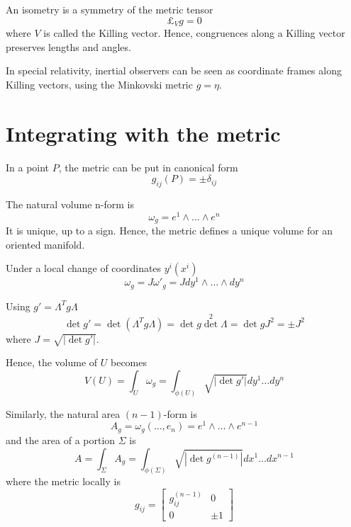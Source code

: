    An isometry is a symmetry of the metric tensor 
    \begin{equation*}
        \pounds_V g = 0
    \end{equation*}
    where $V$ is called the Killing vector. Hence, congruences along a Killing vector preserves lengths and angles.

    In special relativity, inertial observers can be seen as coordinate frames along Killing vectors, using the Minkovski metric $g = \eta$.

\section{Integrating with the metric}

    In a point $P$, the metric can be put in canonical form 
    \begin{equation*}
        g_{ij} (P) = \pm \delta_{ij}
    \end{equation*}

    The natural volume n-form is 
    \begin{equation*}
        \omega_g = e^1 \wedge \ldots \wedge e^n
    \end{equation*}
    It is unique, up to a sign. Hence, the metric defines a unique volume for an oriented manifold.
    
    Under a local change of coordinates $y^i(x^i)$ 
    \begin{equation*}
        \omega_g = J {\omega'}_g = J dy^1 \wedge \ldots \wedge dy^n
    \end{equation*}

    Using $g' = \Lambda^T g \Lambda$
    \begin{equation*}
        \det g' = \det (\Lambda^T g \Lambda) = \det g \det^2 \Lambda = \det g J^2 = \pm J^2
    \end{equation*}
    where $J = \sqrt{|\det g'|}$.

    Hence, the volume of $U$ becomes 
    \begin{equation*}
        V(U) = \int_U \omega_g = \int_{\phi(U)} \sqrt{|\det g'|} dy^1 \ldots dy^n
    \end{equation*}

    Similarly, the natural area $(n-1)$-form is 
    \begin{equation*}
        A_g = \omega_g (\ldots, e_n) = e^1 \wedge \ldots \wedge e^{n-1}
    \end{equation*}
    and the area of a portion $\Sigma$ is 
    \begin{equation*}
        A = \int_{\Sigma} A_g = \int_{\phi(\Sigma)} \sqrt{|\det g^{(n-1)}|} dx^1 \ldots dx^{n-1}
    \end{equation*}
    where the metric locally is 
    \begin{equation*}
        g_{ij} = \begin{bmatrix}
            g_{ij}^{(n-1)} & 0 \\
            0 & \pm 1
        \end{bmatrix}
    \end{equation*}
